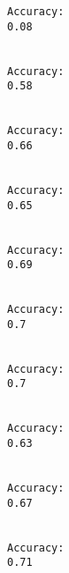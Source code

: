 \documentclass[11pt]{article}
\begin{document}
    \begin{Verbatim}[commandchars=\\\{\}]
Accuracy: 
0.08


Accuracy: 
0.58


Accuracy: 
0.66


Accuracy: 
0.65


Accuracy: 
0.69


Accuracy: 
0.7


Accuracy: 
0.7


Accuracy: 
0.63


Accuracy: 
0.67


Accuracy: 
0.71



    \end{Verbatim}


    
    
    
    
\end{document}
